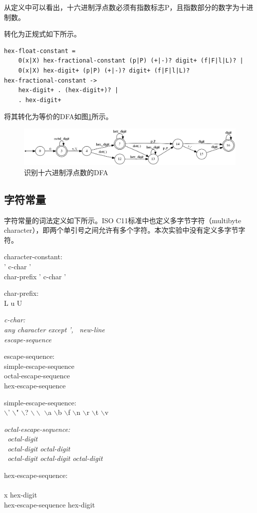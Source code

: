 \documentclass[UTF8, twoside, titlepage]{ctexart}
\newenvironment{lex}
{
	\linespread{1.2}
	\leftskip=2.5cm
	\rightskip=2.5cm
	\itshape
	\setlength{\parindent}{-1cm}
}
{\par}
\begin{document}
从定义中可以看出，十六进制浮点数必须有指数标志P，且指数部分的数字为十进制数。

转化为正规式如下所示。

\begin{lstlisting}
hex-float-constant = 
	0(x|X) hex-fractional-constant (p|P) (+|-)? digit+ (f|F|l|L)? |
	0(x|X) hex-digit+ (p|P) (+|-)? digit+ (f|F|l|L)?
hex-fractional-constant ->
	hex-digit+ . (hex-digit+)? |
	. hex-digit+
\end{lstlisting}

将其转化为等价的DFA如图\ref{fig:hex_float}所示。

\begin{figure}[htbp]
	\centering
	\includegraphics[width=\textwidth]{images/hex_float.png}
	\caption{识别十六进制浮点数的DFA}
	\label{fig:hex_float}
\end{figure}

\subsection{字符常量}
字符常量的词法定义如下所示。ISO C11标准中也定义多字节字符（multibyte character），即两个单引号之间允许有多个字符。本次实验中没有定义多字节字符。

\begin{lex}
character-constant:\\
	' c-char ' \\
	char-prefix ' c-char '
	
char-prefix: \\
{
	\normalfont
	\ttfamily
	L u U
}

\itshape
c-char:\\
	any character except ', \, new-line \\
	escape-sequence
	
escape-sequence:\\
	simple-escape-sequence \\
	octal-escape-sequence \\
	hex-escape-sequence
	
simple-escape-sequence: \\
{
	\normalfont
	\ttfamily
	$\backslash$' $\backslash$" $\backslash$? $\backslash\backslash$ $\backslash$a $\backslash$b $\backslash$f $\backslash$n $\backslash$r $\backslash$t $\backslash$v
}

\itshape
octal-escape-sequence:\\
	\ octal-digit \\
	\ octal-digit octal-digit \\
	\ octal-digit octal-digit octal-digit
	
hex-escape-sequence:\\
	\\x hex-digit \\
   hex-escape-sequence hex-digit
\end{lex}
\end{document}
